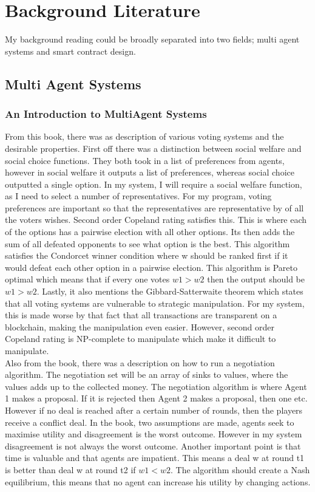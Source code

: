 \chapter{Background Literature} \label{Chapter: Background  Literature}
My background reading could be broadly separated into two fields; multi agent systems and smart contract design.
\section{Multi Agent Systems}
\subsection{An Introduction to MultiAgent Systems \cite{Wooldridge:2009:pdflatex}}
From this book, there was as description of various voting systems and the desirable properties. First off there was a distinction between social welfare and social choice functions. They both took in a list of preferences from agents, however in social welfare it outputs a list of preferences, whereas social choice outputted a single option. In my system, I will require a social welfare function, as I need to select a number of representatives. For my program, voting preferences are important so that the representatives are representative by of all the voters wishes. Second order Copeland rating satisfies this. This is where each of the options has a pairwise election with all other options. Its then adds the sum of all defeated opponents  to see what option is the best. This algorithm satisfies the Condorcet winner condition where w should be ranked first if it would defeat each other option in a pairwise election. This algorithm is Pareto optimal which means that if every one votes $w1>w2$ then the output should be $w1>w2$. Lastly, it also mentions the Gibbard-Satterwaite theorem which states that all voting systems are vulnerable to strategic manipulation. For my system, this is made worse by that fact that all transactions are transparent on a blockchain, making the manipulation even easier. However, second order Copeland rating is NP-complete to manipulate which make it difficult to manipulate.  \\
Also from the book, there was a description on how to run a negotiation algorithm. The negotiation set will be an array of sinks to values, where the values adds up to the collected money. The negotiation algorithm is where Agent 1 makes a proposal. If it is rejected then Agent 2 makes a proposal, then one etc. However if no deal is reached after a certain number of rounds, then the players receive a conflict deal. In the book, two assumptions are made, agents seek to maximise utility and disagreement is the worst outcome. However in my system disagreement is not always the worst outcome. Another important point is that time is valuable and that agents are impatient. This means a deal w at round t1 is better than deal w at round t2 if $w1<w2$. The algorithm should create a Nash equilibrium, this means that no agent can increase his utility by changing actions. \\
